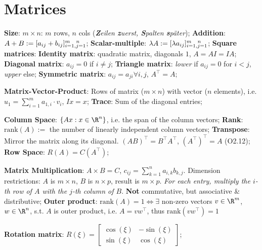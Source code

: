 \newsectionNoPB
\section{Matrices}
\label{sec:matrices}


\textbf{Size}: $m \times n$: $m$ rows, $n$ cols (\textit{\textbf{Z}eilen \textbf{z}uerst, \textbf{S}palten \textbf{s}päter});
\setcounter{all}{2}\shortdef \textbf{Addition}: $A + B := [a_{ij} + b_{ij}]_{i = 1, j = 1}^{m \hspace{3mm} n}$;
\textbf{Scalar-multiple}: $\lambda A := [\lambda a_{ij}]_{i = 1, j = 1}^{m \hspace{3mm} n}$;
\shortdef \textbf{Square matrices}: \textbf{Identity matrix}: quadratic matrix, diagonals $1$, $A = AI = IA$;
\textbf{Diagonal matrix}: $a_{ij} = 0$ if $i \neq j$;
\textbf{Triangle matrix}: \textit{lower} if $a_{ij} = 0$ for $i < j$, \textit{upper} else;
\textbf{Symmetric matrix}: $a_{ij} = a_{ji} \forall i, j$,  $A^{\top} = A$;

\shortdef \textbf{Matrix-Vector-Product}: Rows of matrix ($m \times n$) with vector ($n$ elements), i.e. $u_1 = \sum_{i = 1}^{m} a_{1, i} \cdot v_i$, $Ix = x$;
\textbf{Trace}: Sum of the diagonal entries;

\setcounter{all}{8}\shortdef \textbf{Column Space}: $\{Ax : x \in \R^n\}$, i.e. the span of the column vectors;
\shortdef \textbf{Rank}: $\text{rank}(A) :=$ the number of linearly independent column vectors;
\setcounter{all}{11}\shortdef \textbf{Transpose}: Mirror the matrix along its diagonal. \setcounter{all}{19}\shortlemma $(AB)^{\top} = B^{\top} A^{\top}$, $(A^{\top})^{\top} = A$ (O2.12);
\setcounter{all}{13}\shortdef \textbf{Row Space}: $R(A) = C(A^{\top})$;

\setcounter{all}{16}\shortdef \textbf{Matrix Multiplication}: $A \times B = C$, $c_{ij} = \sum_{k = 1}^{n} a_{i, k} b_{k, j}$. 
Dimension restrictions: $A$ is $m \times n$, $B$ is $n \times p$, result is $m \times p$.
\textit{For each entry, multiply the $i$-th row of $A$ with the $j$-th column of $B$}. \textbf{Not} commutative, but associative \& distributive;
\setcounter{all}{21}\shortlemma \textbf{Outer product}: $\text{rank}(A) = 1 \Leftrightarrow \exists$ non-zero vectors $v \in \R^m$, $w \in \R^n$,
s.t. $A$ is outer product, i.e. $A = vw^{\top}$, thus $\text{rank}(vw^{\top}) = 1$

\textbf{Rotation matrix}: $R(\xi) = \begin{bmatrix}\cos(\xi) & -\sin(\xi)\\ \sin(\xi) & \cos(\xi)\end{bmatrix}$;

